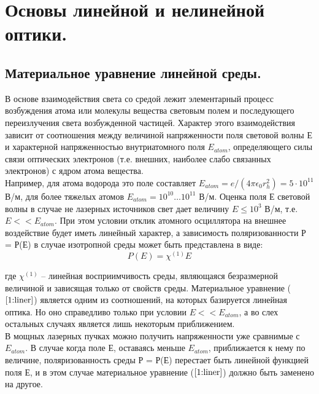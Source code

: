 \section{Основы линейной и нелинейной оптики.}

\subsection{Материальное уравнение линейной среды.}
\hspace*{2mm}
В основе взаимодействия света со средой лежит элементарный процесс возбуждения атома или молекулы вещества световым полем и последующего переизлучения света возбужденной частицей. Характер этого взаимодействия зависит от соотношения между величиной напряженности поля световой волны Е и характерной напряженностью внутриатомного поля  $E_{atom}$, определяющего силы связи оптических электронов (т.е. внешних, наиболее слабо связанных электронов) с ядром атома вещества.
\\
\hspace*{2mm}
Например, для атома водорода это поле составляет $ E_{atom} = e/(4\pi\epsilon_{0}r_{h}^2) = 5\cdot10^{11} $В/м, для более тяжелых атомов $ E_{atom} = 10^{10} \dots 10^{11} $ В/м. Оценка поля Е световой волны в случае не лазерных источников свет дает величину $E \le 10^3$ В/м, т.е. $E<<E_{atom} $. При этом условии отклик атомного осциллятора на внешнее воздействие будет иметь линейный характер, а зависимость поляризованности Р = Р(Е) в случае изотропной среды может быть представлена в виде:
\begin{equation}\label{1:liner}
P(E) = \chi^{(1)}E
\end{equation}

где $ \chi^{(1)}$ – линейная восприимчивость среды, являющаяся безразмерной величиной и зависящая только от свойств среды.
Материальное уравнение ($\ref{1:liner}$) является одним из соотношений, на которых базируется линейная оптика.  Но оно справедливо только при условии $E << E_{atom} $, а во слех остальных случаях является лишь некоторым приближением. 
\\
В мощных лазерных пучках можно получить напряженности уже сравнимые с $E_{atom} $. В случае когда поле Е, оставаясь меньше $E_{atom} $, приближается к нему по величине, поляризованность среды Р = Р(Е) перестает быть линейной функцией поля Е, и в этом случае материальное уравнение ($\ref{1:liner}$) должно быть заменено на другое.

